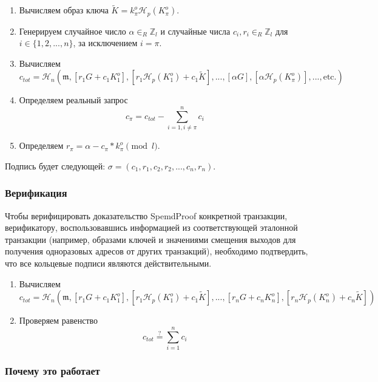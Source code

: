\begin{enumerate}
	\item Вычисляем образ ключа \(\tilde{K} = k^o_\pi \mathcal{H}_p(K^o_\pi)\).

	\item Генерируем случайное число \(\alpha \in_R \mathbb{Z}_l\) и случайные числа \(c_i, r_i \in_R \mathbb{Z}_l\) для \(i \in \{1, 2, ..., n\}\), за исключением \(i = \pi\).

	\item Вычисляем
	\[c_{tot} = \mathcal{H}_n(\mathfrak{m},[r_1 G + c_1 K^o_1],[r_1 \mathcal{H}_p(K^o_1) + c_1 \tilde{K}],...,[\alpha G],[\alpha \mathcal{H}_p(K^o_{\pi})],...,\textrm{etc.})\]

	\item Определяем реальный запрос
	\[c_{\pi} = c_{tot} - \sum^{n}_{i=1,i\neq \pi} c_i\]

	\item Определяем \(r_{\pi} = \alpha - c_{\pi}*k^o_{\pi} \pmod l\).
\end{enumerate}

Подпись будет следующей: $\sigma = (c_1, r_1,c_2,r_2,...,c_n,r_n)$.

\subsubsection*{Верификация}

Чтобы верифицировать доказательство SpemdProof конкретной транзакции, верификатору, воспользовавшись информацией из соответствующей эталонной транзакции (например, обра\-зами ключей и значениями смещения выходов для получения одноразовых адресов от других транзакций), необходимо подтвердить, что все кольцевые подписи являются действительными.

\begin{enumerate}
	\item Вычисляем
	\[c_{tot} = \mathcal{H}_n(\mathfrak{m},[r_1 G + c_1 K^o_1],[r_1 \mathcal{H}_p(K^o_1) + c_1 \tilde{K}],...,[r_n G + c_n K^o_n],[r_n \mathcal{H}_p(K^o_n) + c_n \tilde{K}])\]

	\item Проверяем равенство
	\[c_{tot} \stackrel{?}{=} \sum^{n}_{i=1} c_i\]
\end{enumerate}

\subsubsection*{Почему это работает}

